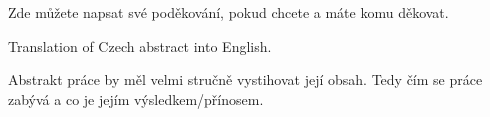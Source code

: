 \documentclass[11pt,twoside,a4paper]{book}
\begin{document}
	
	\translate				%


	\coverpagestarts


	\acknowledgements
	\noindent
	Zde můžete napsat své poděkování, pokud chcete a máte komu děkovat.




 
	\abstractpage

	Translation of Czech abstract into English.


	\baselineskip

	\noindent
	Abstrakt práce by měl velmi stručně vystihovat její obsah. Tedy čím se práce zabývá a co je jejím výsledkem/přínosem.
\end{document}

